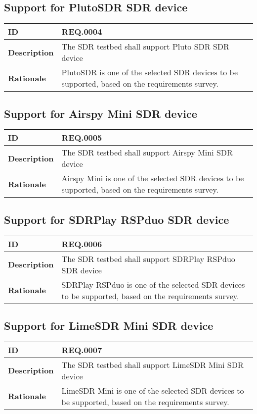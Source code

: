 \documentclass[english,titlepage,a4paper]{report}
\begin{document}
\subsection{Support for PlutoSDR SDR device}
\begin{tabular}{|l|p{9cm}|}
  \hline
  \textbf{ID} & REQ.0004 \\
  \hline
  \textbf{Description} &
  The SDR testbed shall support Pluto SDR SDR device
  \\
  \hline
  \textbf{Rationale} &
  PlutoSDR is one of the selected SDR devices to be supported, based on the requirements survey.
  \\
  \hline
\end{tabular}

\subsection{Support for Airspy Mini SDR device}
\begin{tabular}{|l|p{9cm}|}
  \hline
  \textbf{ID} & REQ.0005 \\
  \hline
  \textbf{Description} &
  The SDR testbed shall support Airspy Mini SDR device
  \\
  \hline
  \textbf{Rationale} &
  Airspy Mini is one of the selected SDR devices to be supported, based on the requirements survey.
  \\
  \hline
\end{tabular}

\subsection{Support for SDRPlay RSPduo SDR device}
\begin{tabular}{|l|p{9cm}|}
  \hline
  \textbf{ID} & REQ.0006 \\
  \hline
  \textbf{Description} &
  The SDR testbed shall support SDRPlay RSPduo SDR device
  \\
  \hline
  \textbf{Rationale} &
  SDRPlay RSPduo is one of the selected SDR devices to be supported, based on the requirements survey.
  \\
  \hline
\end{tabular}

\subsection{Support for LimeSDR Mini SDR device}
\begin{tabular}{|l|p{9cm}|}
  \hline
  \textbf{ID} & REQ.0007 \\
  \hline
  \textbf{Description} &
  The SDR testbed shall support LimeSDR Mini SDR device
  \\
  \hline
  \textbf{Rationale} &
  LimeSDR Mini is one of the selected SDR devices to be supported, based on the requirements survey.
  \\
  \hline
\end{tabular}
\end{document}
